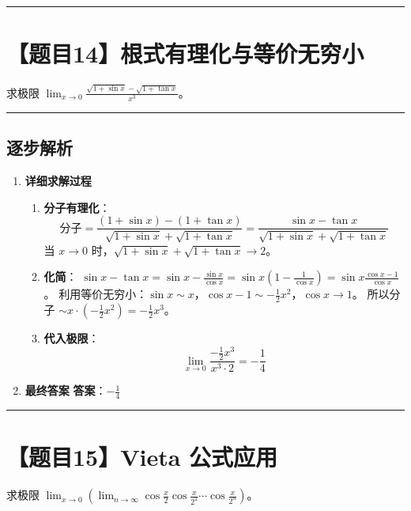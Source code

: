 \documentclass[UTF8]{ctexart}
\newenvironment{redenv}{\color{red}}{}
\newenvironment{detailedanalysis}{%
    \color{red}
    \begin{enumerate}[label=\textbf{第\arabic*步：}, leftmargin=*, align=left, itemsep=1.5ex]
}{%
    \end{enumerate}
}
\newcommand{\problemrule}{\noindent\rule{\textwidth}{1.5pt}\vspace{-0.8em}}
\newcommand{\analysisrule}{\noindent\rule{\textwidth}{0.8pt}\vspace{-0.8em}}
\begin{document}
\problemrule
\section*{【题目14】根式有理化与等价无穷小}
求极限 $ \lim_{x\to0}\frac{\sqrt{1+\sin x}-\sqrt{1+\tan x}}{x^{3}} $。

\begin{redenv}
\analysisrule
\subsection*{逐步解析}

\begin{detailedanalysis}
\item \textbf{详细求解过程}
\begin{enumerate}[label=(\arabic*)]
\item \textbf{分子有理化}：
$$ \text{分子} = \frac{(1+\sin x) - (1+\tan x)}{\sqrt{1+\sin x} + \sqrt{1+\tan x}} = \frac{\sin x - \tan x}{\sqrt{1+\sin x} + \sqrt{1+\tan x}} $$
当 $x \to 0$ 时，$\sqrt{1+\sin x} + \sqrt{1+\tan x} \to 2$。
\item \textbf{化简}：
$\sin x - \tan x = \sin x - \frac{\sin x}{\cos x} = \sin x (1 - \frac{1}{\cos x}) = \sin x \frac{\cos x - 1}{\cos x}$。
利用等价无穷小：$\sin x \sim x$，$\cos x - 1 \sim -\frac{1}{2}x^2$，$\cos x \to 1$。
所以分子 $\sim x \cdot (-\frac{1}{2}x^2) = -\frac{1}{2}x^3$。
\item \textbf{代入极限}：
$$ \lim_{x\to0} \frac{-\frac{1}{2}x^3}{x^3 \cdot 2} = -\frac{1}{4} $$
\end{enumerate}

\item \textbf{最终答案}
\textbf{答案}：$ -\frac{1}{4} $
\end{detailedanalysis}
\end{redenv}

\problemrule
\section*{【题目15】Vieta 公式应用}
求极限 $ \lim_{x\to0}\left(\lim_{n\to\infty}\cos\frac{x}{2}\cos\frac{x}{2^2}\cdots \cos\frac{x}{2^n}\right) $。
\end{document}
